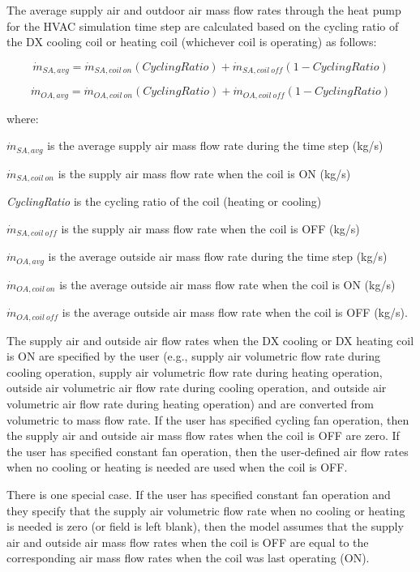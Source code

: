 The average supply air and outdoor air mass flow rates through the heat pump for the HVAC simulation time step are calculated based on the cycling ratio of the DX cooling coil or heating coil (whichever coil is operating) as follows:

\begin{equation}
\dot{m}_{SA,avg} = \dot{m}_{SA,coil~on} \left( {CyclingRatio} \right) + \dot{m}_{SA,coil~off} \left( {1 - CyclingRatio} \right)
\end{equation}

\begin{equation}
\dot{m}_{OA,avg} = \dot{m}_{OA,coil~on} \left( {CyclingRatio} \right) + \dot{m}_{OA,coil~off} \left( {1 - CyclingRatio} \right)
\end{equation}

where:

\(\dot{m}_{SA,avg}\) is the average supply air mass flow rate during the time step (kg/s)

\(\dot{m}_{SA,coil~on}\) is the supply air mass flow rate when the coil is ON (kg/s)

\emph{CyclingRatio} is the cycling ratio of the coil (heating or cooling)

\(\dot{m}_{SA,coil~off}\) is the supply air mass flow rate when the coil is OFF (kg/s)

\(\dot{m}_{OA,avg}\) is the average outside air mass flow rate during the time step (kg/s)

\(\dot{m}_{OA,coil~on}\) is the average outside air mass flow rate when the coil is ON (kg/s)

\(\dot{m}_{OA,coil~off}\) is the average outside air mass flow rate when the coil is OFF (kg/s).

The supply air and outside air flow rates when the DX cooling or DX heating coil is ON are specified by the user (e.g., supply air volumetric flow rate during cooling operation, supply air volumetric flow rate during heating operation, outside air volumetric air flow rate during cooling operation, and outside air volumetric air flow rate during heating operation) and are converted from volumetric to mass flow rate. If the user has specified cycling fan operation, then the supply air and outside air mass flow rates when the coil is OFF are zero. If the user has specified constant fan operation, then the user-defined air flow rates when no cooling or heating is needed are used when the coil is OFF.

There is one special case. If the user has specified constant fan operation and they specify that the supply air volumetric flow rate when no cooling or heating is needed is zero (or field is left blank), then the model assumes that the supply air and outside air mass flow rates when the coil is OFF are equal to the corresponding air mass flow rates when the coil was last operating (ON).

